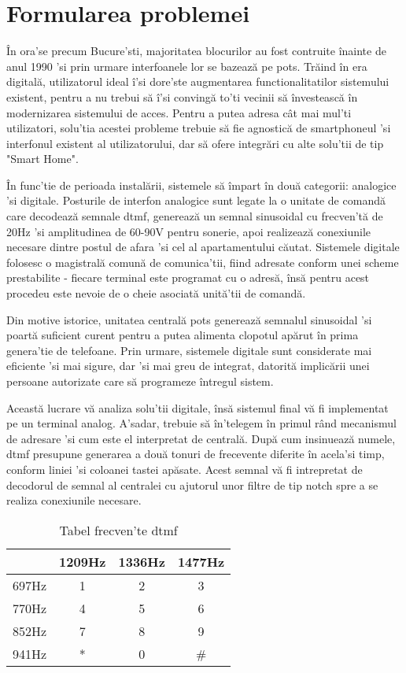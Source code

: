 \section {Formularea problemei}

În ora'se precum Bucure'sti, majoritatea blocurilor au fost contruite înainte de anul 1990 'si prin urmare interfoanele lor se bazează pe \acrshort{pots}. Trăind în era digitală, utilizatorul ideal î'si dore'ste augmentarea functionalitatilor sistemului existent, pentru a nu trebui să î'si convingă to'ti vecinii să învestească în modernizarea sistemului de acces. Pentru a putea adresa cât mai mul'ti utilizatori, solu'tia acestei probleme trebuie să fie agnostică de smartphoneul 'si interfonul existent al utilizatorului, dar să ofere integrări cu alte solu'tii de tip "Smart Home".

În func'tie de perioada instalării, sistemele să împart în două categorii: analogice 'si digitale. Posturile de interfon analogice sunt legate la o unitate de comandă care decodează semnale \acrfull{dtmf}, generează un semnal sinusoidal cu frecven'tă de 20Hz 'si amplitudinea de 60-90V pentru sonerie, apoi realizează conexiunile necesare dintre postul de afara 'si cel al apartamentului căutat. Sistemele digitale folosesc o magistrală comună de comunica'tii, fiind adresate conform unei scheme prestabilite - fiecare terminal este programat cu o adresă, însă pentru acest procedeu este nevoie de o cheie asociată unită'tii de comandă.

Din motive istorice, unitatea centrală \acrshort{pots} generează semnalul sinusoidal 'si poartă suficient curent pentru a putea alimenta clopotul apărut în prima genera'tie de telefoane. Prin urmare, sistemele digitale sunt considerate mai eficiente 'si mai sigure, dar 'si mai greu de integrat, datorită implicării unei persoane autorizate care să programeze întregul sistem.

Această lucrare vă analiza solu'tii digitale, însă sistemul final vă fi implementat pe un terminal analog. A'sadar, trebuie să în'telegem în primul rând mecanismul de adresare 'si cum este el interpretat de centrală. După cum insinuează numele, \acrshort{dtmf} presupune generarea a două tonuri de frecevente diferite în acela'si timp, conform liniei 'si coloanei tastei apăsate. Acest semnal vă fi intrepretat de decodorul de semnal al centralei cu ajutorul unor filtre de tip notch spre a se realiza conexiunile necesare. 

\begin{table}[ht!]
\begin{tabular}{c||c|c|c}
 & 1209Hz & 1336Hz & 1477Hz \\
\hline
\hline
697Hz & 1 & 2 & 3 \\
\hline
770Hz & 4 & 5 & 6 \\
\hline
852Hz & 7 & 8 & 9 \\
\hline
941Hz & * & 0 & \# \\
\end{tabular}
\centering
\caption{Tabel frecven'te \acrshort{dtmf}}
\label{tab:dtmf}
\end{table}

